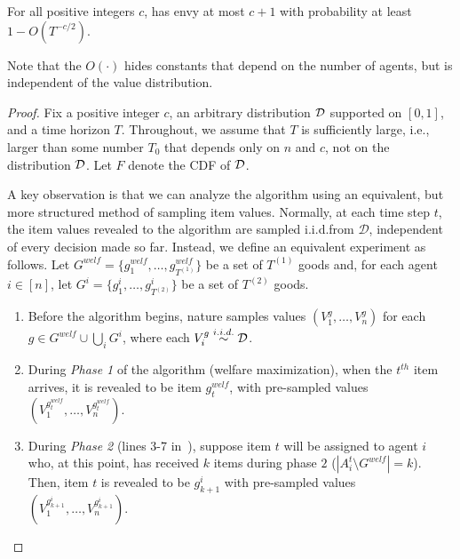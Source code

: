 \begin{theorem}\label{thm:n agent upper bound iid fair division}
For all positive integers $c$,  has envy at most $c + 1$ with probability at least $1 - O(T^{-c/2})$.
\end{theorem}

Note that the $O(\cdot)$ hides constants that depend on the number of agents, but is independent of the value distribution.

\begin{proof}
    Fix a positive integer $c$, an arbitrary distribution $\mathcal{D}$ supported on $[0, 1]$, and a time horizon $T$. Throughout, we assume that $T$ is sufficiently large, i.e., larger than some number $T_0$ that depends only on $n$ and $c$, not on the distribution $\mathcal{D}$. Let $F$ denote the CDF of $\mathcal{D}$. 

    

    A key observation is that we can analyze the algorithm using an equivalent, but more structured method of sampling item values. Normally, at each time step $t$, the item values revealed to the algorithm are sampled i.i.d.\@ from $\mathcal{D}$, independent of every decision made so far. Instead, we define an equivalent experiment as follows. Let $G^{welf} = \{g^{welf}_1, \ldots, g^{welf}_{T^{(1)}}\}$ be a set of $T^{(1)}$ goods and, for each agent $i \in [n]$,  let $G^{i} = \{g^i_1, \ldots, g^i_{T^{(2)}}\}$ be a set of $T^{(2)}$ goods.
    \begin{enumerate}[leftmargin=*]
        \item Before the algorithm begins, nature samples values $(V^g_1, \ldots, V^g_n)$ for each $g \in G^{welf} \cup \bigcup_i G^i$, where each $V^g_i \stackrel{i.i.d.}{\sim} \mathcal{D}$. 
        \item During \emph{Phase 1} of the algorithm (welfare maximization), when the $t^{th}$ item arrives, it is revealed to be  item $g^{welf}_t$, with pre-sampled values $(V^{g^{welf}_t}_1, \ldots, V^{g^{welf}_t}_n)$.
        \item During \emph{Phase 2} (lines 3-7 in~), suppose item $t$ will be assigned to agent $i$ who, at this point, has received $k$ items during phase $2$ ($|A^t_i \setminus G^{welf}| = k$). Then, item $t$ is revealed to be $g^i_{k + 1}$ with pre-sampled values $(V^{g^i_{k + 1}}_1, \ldots, V^{g^i_{k + 1}}_n)$.
    \end{enumerate}


\end{proof}
